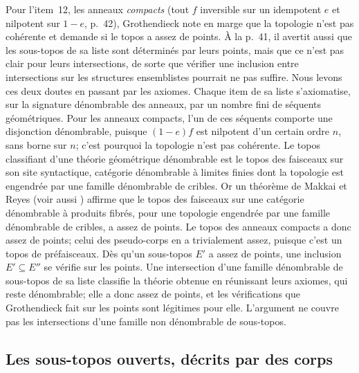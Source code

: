 Pour l'item~12, les anneaux \emph{compacts} (tout $f$ inversible sur un idempotent $e$ et nilpotent sur $1-e$, p.~42), Grothendieck note en marge que la topologie n'est pas cohérente et demande si le topos a assez de points. À la p.~41, il avertit aussi que les sous-topos de sa liste sont déterminés par leurs points, mais que ce n'est pas clair pour leurs intersections, de sorte que vérifier une inclusion entre intersections sur les structures ensemblistes pourrait ne pas suffire. Nous levons ces deux doutes en passant par les axiomes. Chaque item de sa liste s'axiomatise, sur la signature dénombrable des anneaux, par un nombre fini de séquents géométriques. Pour les anneaux compacts, l'un de ces séquents comporte une disjonction dénombrable, puisque $(1-e)f$ est nilpotent d'un certain ordre $n$, sans borne sur $n$; c'est pourquoi la topologie n'est pas cohérente. Le topos classifiant d'une théorie géométrique dénombrable est le topos des faisceaux sur son site syntactique, catégorie dénombrable à limites finies dont la topologie est engendrée par une famille dénombrable de cribles. Or un théorème de Makkai et Reyes \cite[th.~6.2.4]{makkai-reyes} (voir aussi \cite[cor.~3.3.10]{diliberti-rogers}) affirme que le topos des faisceaux sur une catégorie dénombrable à produits fibrés, pour une topologie engendrée par une famille dénombrable de cribles, a assez de points. Le topos des anneaux compacts a donc assez de points; celui des pseudo-corps en a trivialement assez, puisque c'est un topos de préfaisceaux. Dès qu'un sous-topos $E'$ a assez de points, une inclusion $E'\subseteq E''$ se vérifie sur les points. Une intersection d'une famille dénombrable de sous-topos de sa liste classifie la théorie obtenue en réunissant leurs axiomes, qui reste dénombrable; elle a donc assez de points, et les vérifications que Grothendieck fait sur les points sont légitimes pour elle. L'argument ne couvre pas les intersections d'une famille non dénombrable de sous-topos.

\subsection{Les sous-topos ouverts, décrits par des corps}\label{sec:pseudofields-opens}

